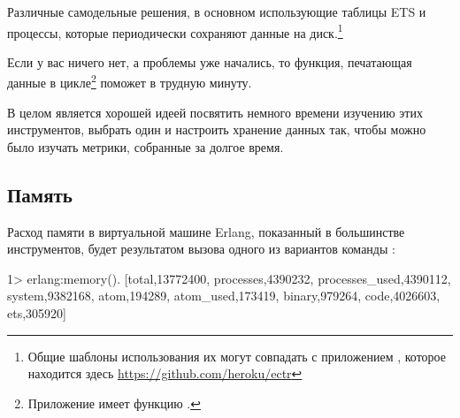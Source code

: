 \documentclass[11pt, oneside]{book}   	%
\begin{document}
\begin{itemize*}
	\item Различные самодельные решения, в основном использующие таблицы ETS и процессы, которые периодически сохраняют данные на диск.\footnote{Общие шаблоны использования их могут совпадать с приложением , которое находится здесь \href{https://github.com/heroku/ectr}{https://github.com/heroku/ectr}}
	\item Если у вас ничего нет, а проблемы уже начались, то функция, печатающая данные в цикле\footnote{Приложение  имеет функцию .} поможет в трудную минуту.
\end{itemize*}

В целом является хорошей идеей посвятить немного времени изучению этих инструментов, выбрать один и настроить хранение данных так, чтобы можно было изучать метрики, собранные за долгое время.


\subsection{Память}

Расход памяти в виртуальной машине Erlang, показанный в большинстве инструментов, будет результатом вызова одного из вариантов команды :

\begin{VerbatimEshell}
1> erlang:memory().
[{total,13772400},
 {processes,4390232},
 {processes_used,4390112},
 {system,9382168},
 {atom,194289},
 {atom_used,173419},
 {binary,979264},
 {code,4026603},
 {ets,305920}]
\end{VerbatimEshell}
\end{document}
